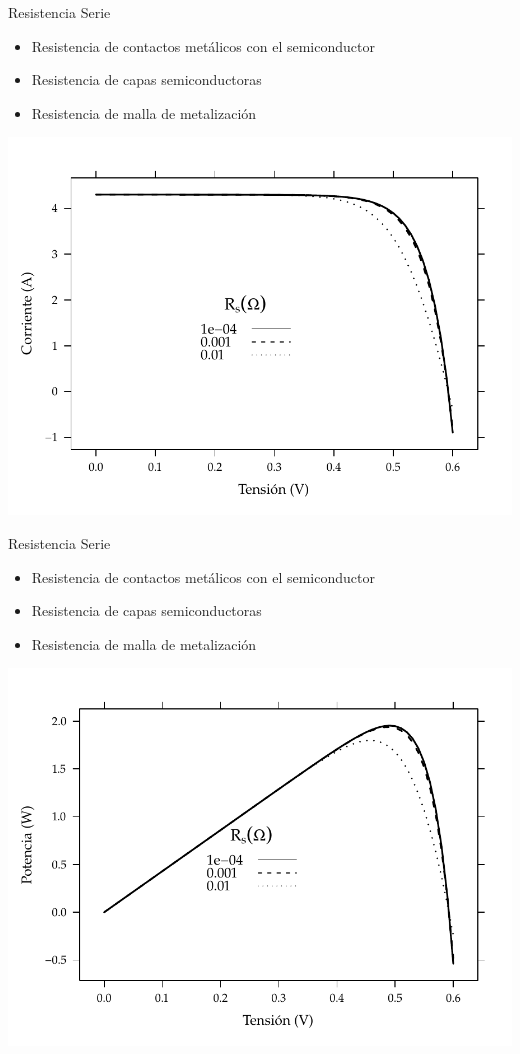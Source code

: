 \documentclass[xcolor={usenames,svgnames,dvipsnames}]{beamer}
\begin{document}
\begin{frame}[label=sec-3-2-2]{Resistencia Serie}
\begin{itemize}
\item Resistencia de contactos metálicos con el semiconductor

\item Resistencia de capas semiconductoras

\item Resistencia de malla de metalización
\end{itemize}

\includegraphics[width=.9\linewidth]{../figs/InfluenciaRs_IV.pdf}
\end{frame}

\begin{frame}[label=sec-3-2-3]{Resistencia Serie}
\begin{itemize}
\item Resistencia de contactos metálicos con el semiconductor

\item Resistencia de capas semiconductoras

\item Resistencia de malla de metalización
\end{itemize}

\includegraphics[width=.9\linewidth]{../figs/InfluenciaRs_Potencia.pdf}
\end{frame}
\end{document}
